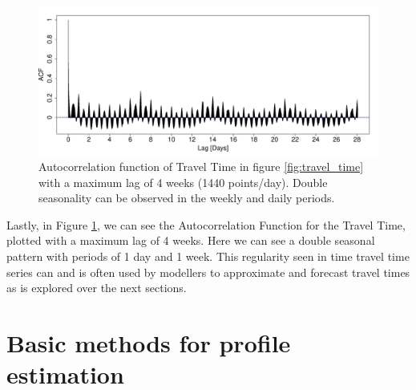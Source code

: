 \documentclass[a4paper, 10pt, conference]{ieeeconf}      %
\begin{document}
\begin{figure}[htbp]
	\centerline{\includegraphics[width=\linewidth]{./images/ACF_M6_Link3.pdf}}
	\caption{Autocorrelation function of Travel Time in figure \ref{fig:travel_time} with a maximum lag of 4 weeks (1440 points/day). Double seasonality can be observed in the weekly and daily periods.}
	\label{fig:ACF}
\end{figure}
Lastly, in Figure \ref{fig:ACF}, we can see the Autocorrelation Function for the Travel Time, plotted with a maximum lag of 4 weeks. Here we can see a double seasonal pattern with periods of 1 day and 1 week.
This regularity seen in time travel time series can and is often used by modellers to approximate and forecast travel times as is explored over the next sections.
\section{Basic methods for profile estimation}\label{Basic methods for profile estimation}
\end{document}
